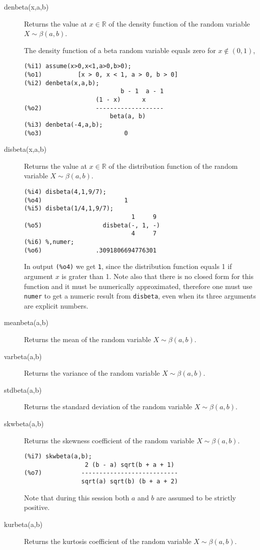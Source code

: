 \documentclass[12pt,a4paper]{article}
\newcommand{\R}{\mathbb{R}}
\begin{document}
\begin{description}

\item[denbeta(x,a,b)] Returns the value at $x \in \R$ of the density function of the random variable $X \sim \beta(a,b)$.

The density function of a beta random variable equals zero for $x \notin (0,1)$,
\begin{verbatim}
(%i1) assume(x>0,x<1,a>0,b>0);
(%o1)          [x > 0, x < 1, a > 0, b > 0]
(%i2) denbeta(x,a,b);
                           b - 1  a - 1
                    (1 - x)      x
(%o2)               -------------------
                        beta(a, b)
(%i3) denbeta(-4,a,b);
(%o3)                       0
\end{verbatim}

\item[disbeta(x,a,b)] Returns the value at $x \in \R$ of the distribution function of the random variable $X \sim \beta(a,b)$.

\begin{verbatim}
(%i4) disbeta(4,1,9/7);
(%o4)                       1
(%i5) disbeta(1/4,1,9/7);
                              1     9
(%o5)                 disbeta(-, 1, -)
                              4     7
(%i6) %,numer;
(%o6)               .3091806694776301
\end{verbatim}
In output \verb|(%o4)| we get \verb|1|, since the distribution function equals 1 if argument $x$ is grater than 1. Note also that there is no closed form for this function and it must be numerically approximated, therefore one must use \verb|numer| to get a numeric result from \verb|disbeta|, even when its three arguments are explicit numbers.

\item[meanbeta(a,b)] Returns the mean of the random variable  $X \sim \beta(a,b)$.

\item[varbeta(a,b)] Returns the variance of the random variable  $X \sim \beta(a,b)$.

\item[stdbeta(a,b)] Returns the standard deviation of the random variable  $X \sim \beta(a,b)$.

\item[skwbeta(a,b)] Returns the skewness coefficient of the random variable  $X \sim \beta(a,b)$.

\begin{verbatim}
(%i7) skwbeta(a,b);
                 2 (b - a) sqrt(b + a + 1)
(%o7)           ---------------------------
                sqrt(a) sqrt(b) (b + a + 2)
\end{verbatim}
Note that during this session both $a$ and $b$ are assumed to be strictly positive.

\item[kurbeta(a,b)] Returns the kurtosis coefficient of the random variable  $X \sim \beta(a,b)$.

\end{description}
\end{document}
